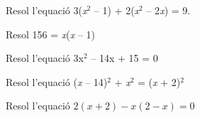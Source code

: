 \begin{autoaval}{40}
	\begin{mylist}

\exer[2] Resol l'equació 3(\textit{x}${}^{2}$ -- 1) + 2(\textit{x}${}^{2}$ -- 2\textit{x}) = 9.
\begin{comment}
\begin{tasks}(4)
\task  \textit{x} = 2 i \textit{x} = 1   
\task  \textit{x} = 1 i \textit{x} = --3 
\task  \textit{x} = 1 i \textit{x} = --2/3  
\task  \textit{x} = 2 i \textit{x} = --6/5
\end{tasks}
\end{comment}

\exer[2] Resol 156 = \textit{x}(\textit{x} -- 1) 
\begin{comment}
\begin{tasks}(4)
	\task  \textit{x} = 11 i \textit{x} = --13  
	\task  \textit{x} = 13 i \underbar{x} = --12  
	\task  \textit{x} = 10 i \textit{x} = 14  
	\task  \textit{x} = --12 i \textit{x} = --11
\end{tasks}
\end{comment}

\exer[2] Resol l'equació 3x${}^{ 2}$ -- 14x + 15 = 0  
\begin{comment}
\begin{tasks}(4)
	\task  \textit{x} = 2 i \textit{x} = 2/3  
	\task  \textit{x} = 1/3 i \textit{x} = 4  
	\task  \textit{x} = 1 i \textit{x} = 4/3  
	\task  x = 5/3 i \textit{x} = 3
\end{tasks}
\end{comment}

\exer[2] Resol l'equació (\textit{x} -- 14)${}^{2}$ + \textit{x}${}^{2}$ = (\textit{x} + 2)${}^{2}$ 
\begin{comment} 
\begin{tasks}(4)
	\task  \textit{x} = 24 i \textit{x} = 8  
	\task  \textit{x} = 21 i \textit{x} = 3  
	\task  \textit{x} = 5 i \textit{x} = 19  
	\task  \textit{x} = 23 i \textit{x} = 2
\end{tasks}
\end{comment}

\exer[2] Resol l'equació $2(x+2)-x(2-x)=0$ 
\begin{comment}
\begin{tasks}(4)
	\task  Infinites   
	\task  \textit{x} = 9 i \textit{x} = 5   
	\task  no té solució  
	\task  \textit{x} = 1 i \textit{x} = 4
\end{tasks}
\end{comment}


\end{mylist}
\end{autoaval}
